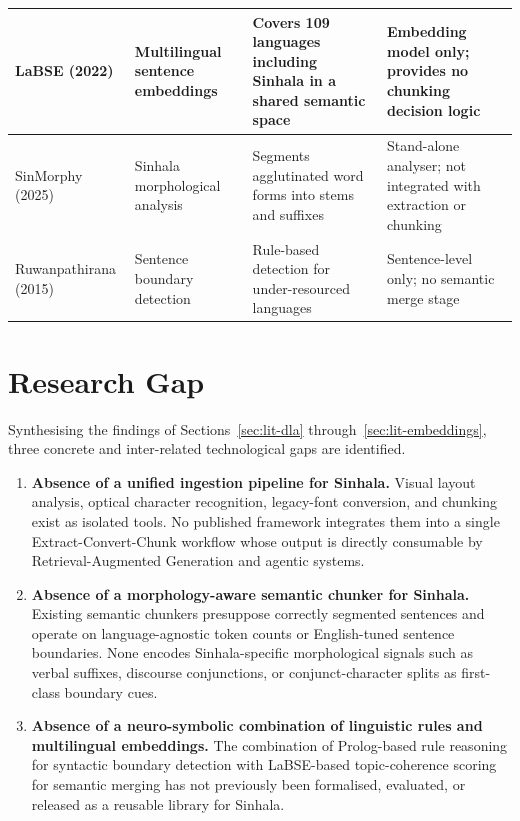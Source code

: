 \documentclass[12pt,a4paper,oneside]{report}
\begin{document}
\begin{table}[h]
\begin{tabularx}{\textwidth}{p{3.3cm} p{2.8cm} X X}
\hline
LaBSE \cite{feng2022labse} (2022) & Multilingual sentence embeddings & Covers 109 languages including Sinhala in a shared semantic space & Embedding model only; provides no chunking decision logic \\
\hline
SinMorphy \cite{pathirana2025sinmorphy} (2025) & Sinhala morphological analysis & Segments agglutinated word forms into stems and suffixes & Stand-alone analyser; not integrated with extraction or chunking \\
\hline
Ruwanpathirana \cite{ruwanpathirana2015sentence} (2015) & Sentence boundary detection & Rule-based detection for under-resourced languages & Sentence-level only; no semantic merge stage \\
\hline
\end{tabularx}
\end{table}

\section{Research Gap}
\label{sec:research-gap}

Synthesising the findings of Sections~\ref{sec:lit-dla} through~\ref{sec:lit-embeddings}, three concrete and inter-related technological gaps are identified.

\begin{enumerate}[label=\textbf{G\arabic*.}, leftmargin=3em]
    \item \textbf{Absence of a unified ingestion pipeline for Sinhala.} Visual layout analysis, optical character recognition, legacy-font conversion, and chunking exist as isolated tools. No published framework integrates them into a single Extract-Convert-Chunk workflow whose output is directly consumable by Retrieval-Augmented Generation and agentic systems.

    \item \textbf{Absence of a morphology-aware semantic chunker for Sinhala.} Existing semantic chunkers presuppose correctly segmented sentences and operate on language-agnostic token counts or English-tuned sentence boundaries. None encodes Sinhala-specific morphological signals such as verbal suffixes, discourse conjunctions, or conjunct-character splits as first-class boundary cues.

    \item \textbf{Absence of a neuro-symbolic combination of linguistic rules and multilingual embeddings.} The combination of Prolog-based rule reasoning for syntactic boundary detection with LaBSE-based topic-coherence scoring for semantic merging has not previously been formalised, evaluated, or released as a reusable library for Sinhala.
\end{enumerate}
\end{document}
